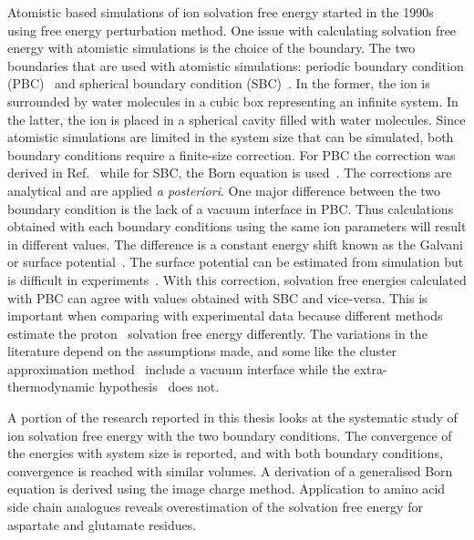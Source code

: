 Atomistic based simulations of ion solvation free energy started in the 1990s using free energy 
perturbation method. One issue with calculating solvation free energy with atomistic simulations 
is the choice of the boundary. The two boundaries that are used with atomistic simulations: 
periodic boundary condition (PBC)~\cite{Hummer1995,Hummer1996} and spherical boundary condition 
(SBC)~\cite{King1989,Beglov1994,Aqvist1990}. In the former, the ion is surrounded by water 
molecules in a cubic box representing an infinite system. In the latter, the ion is placed in 
a spherical cavity filled with water molecules. Since atomistic simulations are limited in the 
system size that can be simulated, both boundary conditions require a finite-size correction. 
For PBC the correction was derived in Ref.~\cite{Hummer1996} while for SBC, the Born equation is 
used~\cite{Aqvist1990}. The corrections are analytical and are applied \textit{a posteriori}. 
One major difference between the two boundary condition is the lack of a vacuum interface in 
PBC. Thus calculations obtained with each boundary conditions using the same ion parameters 
will result in different values. The difference is a constant energy shift known as the Galvani 
or surface potential~\cite{Lin2014a}. The surface potential can be estimated from simulation but 
is difficult in experiments~\cite{Lamoureux2006}. With this correction, solvation free energies 
calculated with PBC can agree with values obtained with SBC and vice-versa. This is important 
when comparing with experimental data because different methods estimate the proton \Hi\ 
solvation free energy differently. The variations in the literature depend on the assumptions 
made, and some like the cluster approximation method~\cite{Tissandier1998} include a vacuum 
interface while the extra-thermodynamic hypothesis~\cite{Schmid2000,Marcus1994} does not. 

A portion of the research reported in this thesis looks at the systematic study of ion 
solvation free energy with the two boundary conditions. The convergence of the energies with 
system size is reported, and with both boundary conditions, convergence is reached with similar 
volumes. A derivation of a generalised Born equation is derived using the image charge method. 
Application to amino acid side chain analogues reveals overestimation of the solvation free 
energy for aspartate and glutamate residues.

